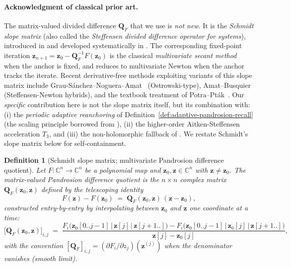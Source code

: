 \documentclass[11pt,a4paper]{article}
\newtheorem{definition}[theorem]{Definition}
\begin{document}
\paragraph{Acknowledgment of classical prior art.} The matrix-valued divided difference $\mathbf{Q}_F$ that we use is \emph{not new}. It is the \emph{Schmidt slope matrix} (also called the \emph{Steffensen divided difference operator for systems}), introduced in \cite{schmidt1963} and developed systematically in \cite[Chapter 11]{ortegarheinboldt1970}. The corresponding fixed-point iteration $\mathbf{z}_{n+1} = \mathbf{z}_0 - \mathbf{Q}_F^{-1} F(\mathbf{z}_0)$ is the classical \emph{multivariate secant method} when the anchor is fixed, and reduces to multivariate Newton when the anchor tracks the iterate. Recent derivative-free methods exploiting variants of this slope matrix include Grau-S\'anchez--Noguera--Amat~\cite{grausanchez2011} (Ostrowski-type), Amat--Busquier~\cite{amat-busquier} (Steffensen-Newton hybrids), and the textbook treatment of Potra--Pt\'ak~\cite{potraptak1984}. Our \emph{specific} contribution here is not the slope matrix itself, but its combination with: (i) the \emph{periodic adaptive reanchoring} of Definition~\ref{def:adaptive-pandrosion-recall} (the scaling principle borrowed from \cite{besevic-real}), (ii) the higher-order Aitken-Steffensen acceleration $T_3$, and (iii) the non-holomorphic fallback of \cite{besevic7}. We restate Schmidt's slope matrix below for self-containment.

\begin{definition}[Schmidt slope matrix; multivariate Pandrosion difference quotient]\label{def:multivariate-Q}
Let $F: \mathbb{C}^n \to \mathbb{C}^n$ be a polynomial map and $\mathbf{z}_0, \mathbf{z} \in \mathbb{C}^n$ with $\mathbf{z} \ne \mathbf{z}_0$. The \emph{matrix-valued Pandrosion difference quotient} is the $n \times n$ complex matrix $\mathbf{Q}_F(\mathbf{z}_0, \mathbf{z})$ defined by the telescoping identity
\begin{equation}
F(\mathbf{z}) - F(\mathbf{z}_0) \;=\; \mathbf{Q}_F(\mathbf{z}_0, \mathbf{z})\,(\mathbf{z} - \mathbf{z}_0),
\label{eq:multivariate-telescope}
\end{equation}
constructed entry-by-entry by interpolating between $\mathbf{z}_0$ and $\mathbf{z}$ one coordinate at a time:
\begin{equation}
\bigl[\mathbf{Q}_F(\mathbf{z}_0, \mathbf{z})\bigr]_{i, j} \;=\; \frac{F_i\bigl(\mathbf{z}_0[0..j-1]\,|\,\mathbf{z}[j]\,|\,\mathbf{z}[j+1..]\bigr) - F_i\bigl(\mathbf{z}_0[0..j-1]\,|\,\mathbf{z}_0[j]\,|\,\mathbf{z}[j+1..]\bigr)}{\mathbf{z}[j] - \mathbf{z}_0[j]},
\label{eq:multivariate-Q-entry}
\end{equation}
with the convention $[\mathbf{Q}_F]_{i, j} = (\partial F_i / \partial z_j)(\mathbf{z}^{(j)})$ when the denominator vanishes (smooth limit).
\end{definition}
\end{document}
